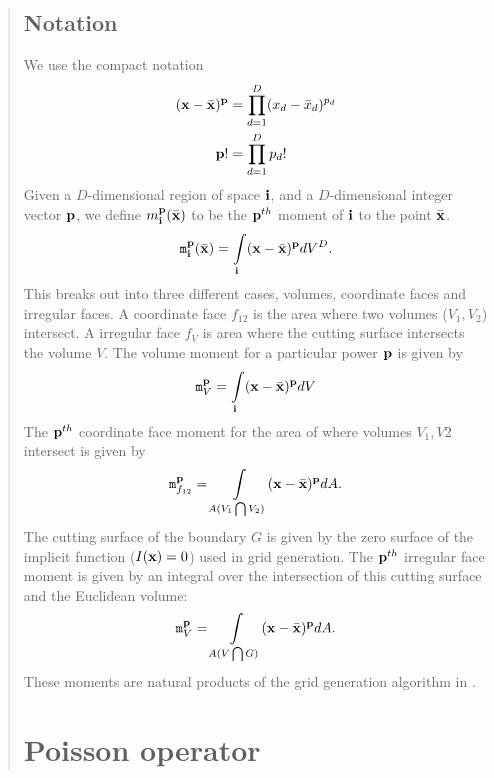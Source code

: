 \documentclass{article}
\begin{document}
\begin{abstract}
\subsection{Notation}

We use the compact notation
\begin{align*}
(\xbold - \xbar)^\pbold &= \prod\limits^D_{d=1} (x_d - {\bar x}_d)^{p_d} \\
\pbold! &= \prod\limits^D_{d = 1} p_d!
\end{align*}
Given a $D$-dimensional region of space $\ibold$, 
and a $D$-dimensional integer vector
$\pbold$, we define $m_\ibold^\pbold(\xbar)$ to be the $\pbold^{th}$
moment of $\ibold$ to the point $\xbar$.
\begin{equation}
\mcal_\ibold^\pbold(\xbar)  =  \int\limits_{\ibold} (\xbold - \xbar)^\pbold dV^D.
\label{eqn::volmoment}
\end{equation}
This breaks out into three different cases, volumes, coordinate faces
and irregular faces.
A coordinate face $f_{12}$  is the area where two
volumes ($V_1, V_2$) intersect.
A irregular face $f_V$  is area where the cutting surface
intersects the volume $V$.
The volume moment for a particular power $\pbold$  is
given by
\begin{equation}
  \mcal^\pbold_V = \int\limits_{\ibold} (\xbold - \xbar)^\pbold dV
  \label{eqn::volmom}
\end{equation}
The $\pbold^{th}$ coordinate face moment for the area of where volumes $V_1, V2$
intersect is given by
\begin{equation}
  \mcal^\pbold_{f_{12}} = \int\limits_{A(V_1\bigcap V_2)} (\xbold - \xbar)^\pbold dA.
  \label{eqn::facmom}
\end{equation}
The cutting surface of the boundary $G$ is given by  the zero
surface of the  implicit function ($I(\xbold)= 0$) used in grid generation.
The $\pbold^{th}$ irregular face moment is given by an integral over
the intersection of this cutting surface and the Euclidean volume:
\begin{equation}
  \mcal^\pbold_V = \int\limits_{A(V \bigcap G)} (\xbold - \xbar)^\pbold dA.
  \label{eqn::irrmom}
\end{equation}
These moments are natural products of the grid generation algorithm
in \cite{Schwartz2015}.


\section{Poisson operator}


\end{abstract}
\end{document}
